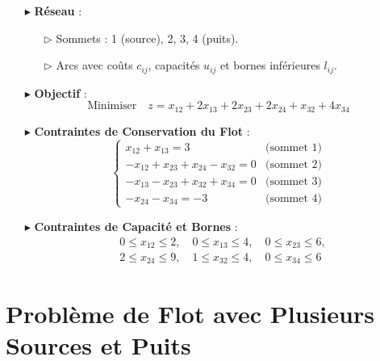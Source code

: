 \documentclass{report}
\begin{document}
\begin{multicols*}{2}
\begin{tikzpicture}[scale=1.1]
\end{tikzpicture}
\begin{itemize}
    \item[$\blacktriangleright$] \textbf{Réseau} :
    \begin{itemize}
        \item[$\rhd$] Sommets : 1 (source), 2, 3, 4 (puits).
        \item[$\rhd$] Arcs avec coûts \( c_{ij} \), capacités \( u_{ij} \) et bornes inférieures \( l_{ij} \).
    \end{itemize}
    \item[$\blacktriangleright$] \textbf{Objectif} :
    \[
    \text{Minimiser} \quad z = x_{12} + 2x_{13} + 2x_{23} + 2x_{24} + x_{32} + 4x_{34}
    \]
    \item[$\blacktriangleright$] \textbf{Contraintes de Conservation du Flot} :
    \[
    \begin{cases}
    x_{12} + x_{13} = 3 & \text{(sommet 1)} \\
    -x_{12} + x_{23} + x_{24} - x_{32} = 0 & \text{(sommet 2)} \\
    -x_{13} - x_{23} + x_{32} + x_{34} = 0 & \text{(sommet 3)} \\
    -x_{24} - x_{34} = -3 & \text{(sommet 4)}
    \end{cases}
    \]
    \item[$\blacktriangleright$] \textbf{Contraintes de Capacité et Bornes} :
    \[
    \begin{aligned}
    & 0 \leq x_{12} \leq 2, \quad 0 \leq x_{13} \leq 4, \quad 0 \leq x_{23} \leq 6, \\
    & 2 \leq x_{24} \leq 9, \quad 1 \leq x_{32} \leq 4, \quad 0 \leq x_{34} \leq 6
    \end{aligned}
    \]
\end{itemize}

\section*{Problème de Flot avec Plusieurs Sources et Puits}


\end{multicols*}
\end{document}

